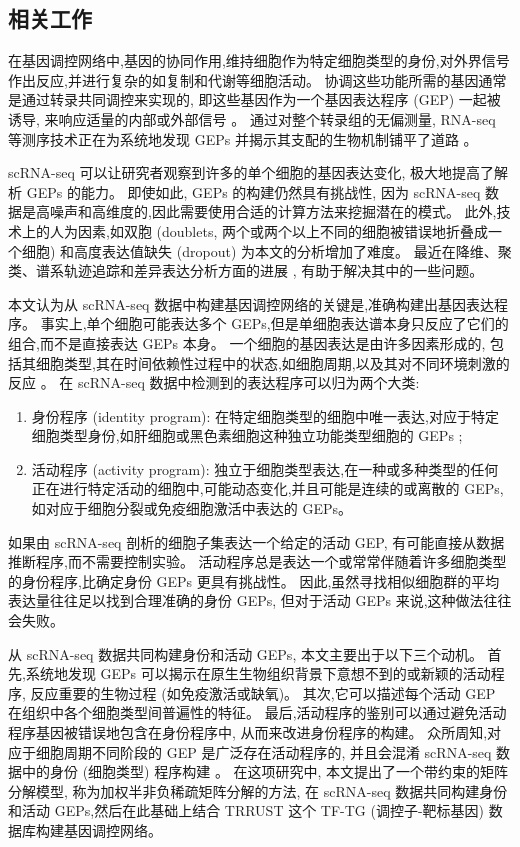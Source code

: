 \subsection{相关工作}
在基因调控网络中,基因的协同作用,维持细胞作为特定细胞类型的身份,对外界信号作出反应,并进行复杂的如复制和代谢等细胞活动。
协调这些功能所需的基因通常是通过转录共同调控来实现的,
即这些基因作为一个基因表达程序 (GEP) 一起被诱导,
来响应适量的内部或外部信号 。
通过对整个转录组的无偏测量, RNA-seq 等测序技术正在为系统地发现 GEPs 并揭示其支配的生物机制铺平了道路 。

scRNA-seq 可以让研究者观察到许多的单个细胞的基因表达变化,
极大地提高了解析 GEPs 的能力。
即使如此, GEPs 的构建仍然具有挑战性,
因为 scRNA-seq 数据是高噪声和高维度的,因此需要使用合适的计算方法来挖掘潜在的模式。
此外,技术上的人为因素,如双胞 (doublets, 两个或两个以上不同的细胞被错误地折叠成一个细胞) 和高度表达值缺失 (dropout) 为本文的分析增加了难度。
最近在降维、聚类、谱系轨迹追踪和差异表达分析方面的进展 ,
有助于解决其中的一些问题。

本文认为从 scRNA-seq 数据中构建基因调控网络的关键是,准确构建出基因表达程序。
事实上,单个细胞可能表达多个 GEPs,但是单细胞表达谱本身只反应了它们的组合,而不是直接表达 GEPs 本身。
一个细胞的基因表达是由许多因素形成的,
包括其细胞类型,其在时间依赖性过程中的状态,如细胞周期,以及其对不同环境刺激的反应 。
在 scRNA-seq 数据中检测到的表达程序可以归为两个大类:
\begin{enumerate}[label=(\arabic*)]
    \item 身份程序 (identity program): 在特定细胞类型的细胞中唯一表达,对应于特定细胞类型身份,如肝细胞或黑色素细胞这种独立功能类型细胞的 GEPs ;
    \item 活动程序 (activity program): 独立于细胞类型表达,在一种或多种类型的任何正在进行特定活动的细胞中,可能动态变化,并且可能是连续的或离散的 GEPs,如对应于细胞分裂或免疫细胞激活中表达的 GEPs。
\end{enumerate}

如果由 scRNA-seq 剖析的细胞子集表达一个给定的活动 GEP,
有可能直接从数据推断程序,而不需要控制实验。
活动程序总是表达一个或常常伴随着许多细胞类型的身份程序,比确定身份 GEPs 更具有挑战性。
因此,虽然寻找相似细胞群的平均表达量往往足以找到合理准确的身份 GEPs,
但对于活动 GEPs 来说,这种做法往往会失败。

从 scRNA-seq 数据共同构建身份和活动 GEPs, 本文主要出于以下三个动机。
首先,系统地发现 GEPs 可以揭示在原生生物组织背景下意想不到的或新颖的活动程序,
反应重要的生物过程 (如免疫激活或缺氧)。
其次,它可以描述每个活动 GEP 在组织中各个细胞类型间普遍性的特征。
最后,活动程序的鉴别可以通过避免活动程序基因被错误地包含在身份程序中, 从而来改进身份程序的构建。
众所周知,对应于细胞周期不同阶段的 GEP 是广泛存在活动程序的,
并且会混淆 scRNA-seq 数据中的身份 (细胞类型) 程序构建 。
在这项研究中, 本文提出了一个带约束的矩阵分解模型, 称为加权半非负稀疏矩阵分解的方法,
在 scRNA-seq 数据共同构建身份和活动 GEPs,然后在此基础上结合 TRRUST 这个 TF-TG (调控子-靶标基因) 数据库构建基因调控网络。

